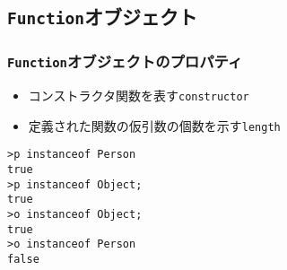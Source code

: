 \subsection{\protect\texttt{Function}オブジェクト}
\begin{frame}[containsverbatim]
\frametitle{\protect\texttt{Function}オブジェクトのプロパティ}
\begin{itemize}
 \item コンストラクタ関数を表す\texttt{constructor}
 \item 定義された関数の仮引数の個数を示す\texttt{length} 
\end{itemize}
\begin{Verbatim}
>p instanceof Person
true
>p instanceof Object;
true
>o instanceof Object;
true
>o instanceof Person
false
\end{Verbatim}
 \iffalse
重要な\texttt{prototype} プロパティがある。
 これについては次回の授業で解説をする。
 \fi
\end{frame}
\fi
